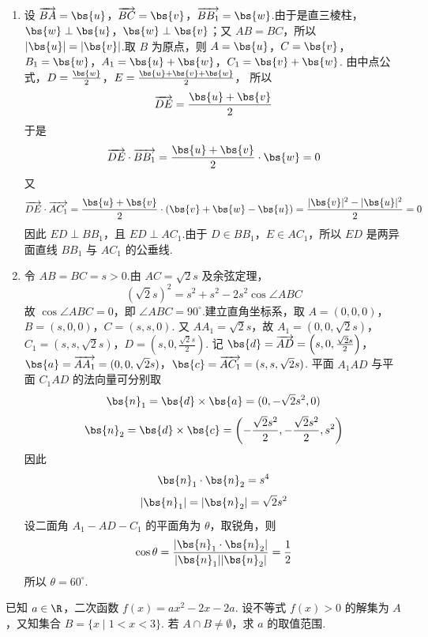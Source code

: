 \begin{solution}
\begin{enumerate}
\item 设 \(\overrightarrow{BA}=\bs{u}\)，\(\overrightarrow{BC}=\bs{v}\)，\(\overrightarrow{BB_{1}}=\bs{w}\).由于是直三棱柱，\(\bs{w}\perp\bs{u}\)，\(\bs{w}\perp\bs{v}\)；又 \(AB=BC\)，所以 \(|\bs{u}|=|\bs{v}|\).取 \(B\) 为原点，则 \(A=\bs{u}\)，\(C=\bs{v}\)，\(B_{1}=\bs{w}\)，\(A_{1}=\bs{u}+\bs{w}\)，\(C_{1}=\bs{v}+\bs{w}\).
由中点公式，\(D=\frac{\bs{w}}{2}\)，\(E=\frac{\bs{u}+\bs{v}+\bs{w}}{2}\)，
所以
\[
\overrightarrow{DE}=\frac{\bs{u}+\bs{v}}{2}
\]
于是
\[
\overrightarrow{DE}\cdot\overrightarrow{BB_{1}}
=\frac{\bs{u}+\bs{v}}{2}\cdot\bs{w}=0
\]
又
\[
\overrightarrow{DE}\cdot\overrightarrow{AC_{1}}
=\frac{\bs{u}+\bs{v}}{2}\cdot(\bs{v}+\bs{w}-\bs{u})
=\frac{|\bs{v}|^{2}-|\bs{u}|^{2}}{2}=0
\]
因此 \(ED\perp BB_{1}\)，且 \(ED\perp AC_{1}\).由于 \(D\in BB_{1}\)，\(E\in AC_{1}\)，所以 \(ED\) 是两异面直线 \(BB_{1}\) 与 \(AC_{1}\) 的公垂线.

\item 令 \(AB=BC=s>0\).由 \(AC=\sqrt2s\) 及余弦定理，
\[
(\sqrt2s)^{2}=s^{2}+s^{2}-2s^{2}\cos\angle ABC
\]
故 \(\cos\angle ABC=0\)，即 \(\angle ABC=90^{\circ}\).建立直角坐标系，取
\(A=(0,0,0)\)，\(B=(s,0,0)\)，\(C=(s,s,0)\).
又 \(AA_{1}=\sqrt2s\)，故
\(A_{1}=(0,0,\sqrt2s)\)，\(C_{1}=(s,s,\sqrt2s)\)，\(D=\left(s,0,\frac{\sqrt2s}{2}\right)\).
记
\(\bs{d}=\overrightarrow{AD}=\left(s,0,\frac{\sqrt2s}{2}\right)\)，\(\bs{a}=\overrightarrow{AA_{1}}=(0,0,\sqrt2s)\)，\(\bs{c}=\overrightarrow{AC_{1}}=(s,s,\sqrt2s)\).
平面 \(A_{1}AD\) 与平面 \(C_{1}AD\) 的法向量可分别取
\[
\bs{n}_{1}=\bs{d}\times\bs{a}=(0,-\sqrt2s^{2},0)
\]
\[
\bs{n}_{2}=\bs{d}\times\bs{c}
=\left(-\frac{\sqrt2s^{2}}2,-\frac{\sqrt2s^{2}}2,s^{2}\right)
\]
因此
\[
\bs{n}_{1}\cdot\bs{n}_{2}=s^{4}
\]
\[
|\bs{n}_{1}|=|\bs{n}_{2}|=\sqrt2s^{2}
\]
设二面角 \(A_{1}-AD-C_{1}\) 的平面角为 \(\theta\)，取锐角，则
\[
\cos\theta=\frac{|\bs{n}_{1}\cdot\bs{n}_{2}|}{|\bs{n}_{1}||\bs{n}_{2}|}
=\frac12
\]
所以 \(\theta=60^{\circ}\).
\end{enumerate}
\end{solution}

\begin{problem}
已知 \(a \in \R\)，二次函数 \(f(x) = ax^2 - 2x - 2a\). 设不等式 \(f(x) > 0\) 的解集为 \(A\)，又知集合 \(B = \{x \mid 1 < x < 3\}\). 若 \(A \cap B \neq \emptyset\)，求 \(a\) 的取值范围.
\end{problem}

